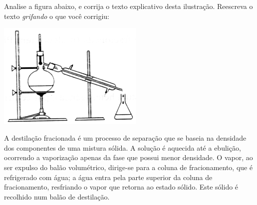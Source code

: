 Analise a figura abaixo, e corrija o texto explicativo desta ilustração.
Reescreva o texto \textit{grifando} o que você corrigiu:

\begin{center}
	\includegraphics[width = 7cm]{figure.png}
\end{center}

A destilação fracionada é um processo de separação que se baseia na densidade dos componentes de uma mistura sólida.
A solução é aquecida até a ebulição, ocorrendo a vaporização apenas da fase que possui menor densidade.
O vapor, ao ser expulso do balão volumétrico, dirige-se para a coluna de fracionamento, que é refrigerado com água;
a água entra pela parte superior da coluna de fracionamento, resfriando o vapor que retorna ao estado sólido.
Este sólido é recolhido num balão de destilação.
